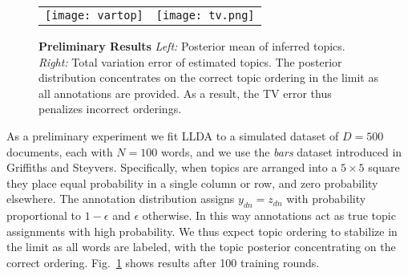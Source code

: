 \documentclass{article}
\begin{document}
\begin{figure}[t]
  \centering
  \begin{tabular}{cc}
    \texttt{[image: vartop]} &
    \texttt{[image: tv.png]}
  \end{tabular}
  \caption{\small \textbf{Preliminary Results} \emph{Left:} Posterior
    mean of inferred topics.  \emph{Right:} Total variation error of
    estimated topics.  The posterior distribution concentrates on the
    correct topic ordering in the limit as all annotations are
    provided.  As a result, the TV error thus penalizes incorrect
    orderings.}
  \label{fig:llda_results}
\end{figure}

As a preliminary experiment we fit LLDA to a simulated dataset of
$D=500$ documents, each with $N=100$ words, and we use the \emph{bars}
dataset introduced in Griffiths and Steyvers.  Specifically, when
topics are arranged into a $5\times 5$ square they place equal
probability in a single column or row, and zero probability elsewhere.
The annotation distribution assigns $y_{dn} = z_{dn}$ with probability
proportional to $1-\epsilon$ and $\epsilon$ otherwise.  In this way
annotations act as true topic assignments with high probability.  We
thus expect topic ordering to stabilize in the limit as all words are
labeled, with the topic posterior concentrating on the correct
ordering.  Fig.~\ref{fig:llda_results} shows results after 100
training rounds.
\end{document}
